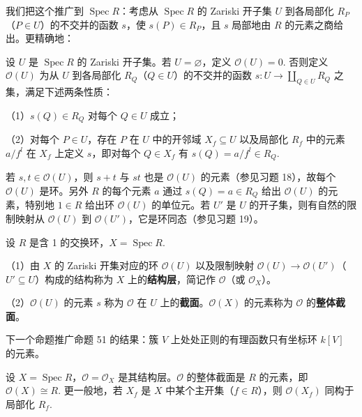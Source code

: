 我们把这个推广到 \(\operatorname{Spec}R\)：考虑从 \(\operatorname{Spec}R\) 的 Zariski 开子集 \(U\) 到各局部化 \(R_P\)（\(P \in U\)）的不交并的函数 \(s\)，使 \(s(P) \in R_P\)，且 \(s\) 局部地由 \(R\) 的元素之商给出。更精确地：

\begin{definition}
设 \(U\) 是 \(\operatorname{Spec}R\) 的 Zariski 开子集。若 \(U = \varnothing\)，定义 \(\mathcal{O}(U) = 0\). 否则定义 \(\mathcal{O}(U)\) 为从 \(U\) 到各局部化 \(R_Q\)（\(Q \in U\)）的不交并的函数 \(s : U \to \coprod_{Q \in U}R_Q\) 之集，满足下述两条性质：

（1）\(s(Q) \in R_Q\) 对每个 \(Q \in U\) 成立；

（2）对每个 \(P \in U\)，存在 \(P\) 在 \(U\) 中的开邻域 \(X_f \subseteq U\) 以及局部化 \(R_f\) 中的元素 \(a/f^l\) 在 \(X_f\) 上定义 \(s\)，即对每个 \(Q \in X_f\) 有 \(s(Q) = a/f^l \in R_Q\).
\end{definition}

若 \(s, t \in \mathcal{O}(U)\)，则 \(s+t\) 与 \(st\) 也是 \(\mathcal{O}(U)\) 的元素（参见习题 18），故每个 \(\mathcal{O}(U)\) 是环。另外 \(R\) 的每个元素 \(a\) 通过 \(s(Q) = a \in R_Q\) 给出 \(\mathcal{O}(U)\) 的元素，特别地 \(1 \in R\) 给出环 \(\mathcal{O}(U)\) 的单位元。若 \(U'\) 是 \(U\) 的开子集，则有自然的限制映射从 \(\mathcal{O}(U)\) 到 \(\mathcal{O}(U')\)，它是环同态（参见习题 19）。

\begin{definition}
设 \(R\) 是含 1 的交换环，\(X = \operatorname{Spec}R\).

（1）由 \(X\) 的 Zariski 开集对应的环 \(\mathcal{O}(U)\) 以及限制映射 \(\mathcal{O}(U) \to \mathcal{O}(U')\)（\(U' \subseteq U\)）构成的结构称为 \(X\) 上的\textbf{结构层}，简记作 \(\mathcal{O}\)（或 \(\mathcal{O}_X\)）。

（2）\(\mathcal{O}(U)\) 的元素 \(s\) 称为 \(\mathcal{O}\) 在 \(U\) 上的\textbf{截面}。\(\mathcal{O}(X)\) 的元素称为 \(\mathcal{O}\) 的\textbf{整体截面}。
\end{definition}

下一个命题推广命题 51 的结果：簇 \(V\) 上处处正则的有理函数只有坐标环 \(k[V]\) 的元素。

\begin{proposition}\label{pro:15.57}
设 \(X = \operatorname{Spec}R\)，\(\mathcal{O} = \mathcal{O}_X\) 是其结构层。\(\mathcal{O}\) 的整体截面是 \(R\) 的元素，即 \(\mathcal{O}(X) \cong R\). 更一般地，若 \(X_f\) 是 \(X\) 中某个主开集（\(f \in R\)），则 \(\mathcal{O}(X_f)\) 同构于局部化 \(R_f\).
\end{proposition}

